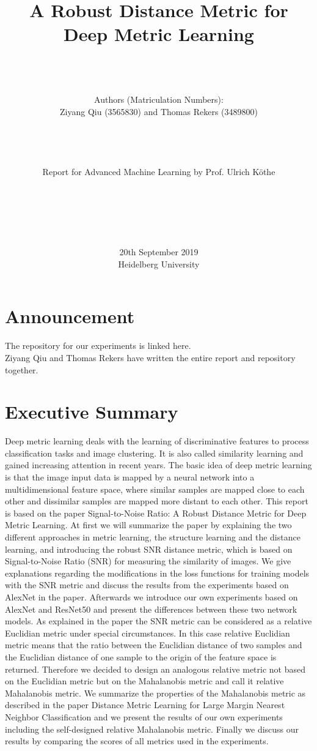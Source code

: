 \documentclass[12pt,paper=a4]{scrartcl}
\title{A Robust Distance Metric for Deep Metric Learning}
\author{\\ \\ \\Authors (Matriculation Numbers): \\
Ziyang Qiu (3565830) and Thomas Rekers (3489800) \\ \\ \\ \\ \\ Report for Advanced Machine Learning by Prof. Ulrich Köthe \\ \\ \\ \\ \\ \\}
\date{20th September 2019 \\ Heidelberg University}
\theoremstyle{break}
\begin{document}
\maketitle
\vfill
\thispagestyle{empty}
\cleardoublepage

\tableofcontents
\thispagestyle{empty}
\cleardoublepage

\setcounter{page}{1}
\section*{Announcement}
The repository for our experiments is linked here.\cite{repo}\\
Ziyang Qiu and Thomas Rekers have written the entire report and repository together.
\section{Executive Summary}
Deep metric learning deals with the learning of discriminative features to process classification tasks and image clustering. It is also called similarity learning and gained increasing attention in recent years. The basic idea of deep metric learning is that the image input data is mapped by a neural network into a multidimensional feature space, where similar samples are mapped close to each other and dissimilar samples are mapped more distant to each other. This report is based on the paper \dq Signal-to-Noise Ratio: A Robust Distance Metric for Deep Metric Learning\dq \cite{source1}. At first we will summarize the paper by explaining the two different approaches in metric learning, the structure learning and the distance learning, and introducing the robust SNR distance metric, which is based on Signal-to-Noise Ratio (SNR) for measuring the similarity of images. We give explanations regarding the modifications in the loss functions for training models with the SNR metric and discuss the results from the experiments based on AlexNet in the paper. Afterwards we introduce our own experiments based on AlexNet and ResNet50 and present the differences between these two network models. As explained in the paper the SNR metric can be considered as a relative Euclidian metric under special circumstances. In this case relative Euclidian metric means that the ratio between the Euclidian distance of two samples and the Euclidian distance of one sample to the origin of the feature space is returned. Therefore we decided to design an analogous relative metric not based on the Euclidian metric but on the Mahalanobis metric and call it relative Mahalanobis metric. We summarize the properties of the Mahalanobis metric as described in the paper \dq Distance Metric Learning for Large Margin Nearest Neighbor Classification\dq\cite{weinberger} and we present the results of our own experiments\cite{repo} including the self-designed relative Mahalanobis metric. Finally we discuss our results by comparing the scores of all metrics used in the experiments.
\end{document}
